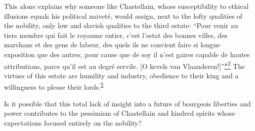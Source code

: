 This alone explains why someone like Chastellain, whose susceptibility
to ethical illusions equals his political naiveté, would assign, next to
the lofty qualities of the nobility, only low and slavish qualities to
the third estate: ``Pour venir au tiers membre qui fait le royaume
entier, c'est l'estat des bonnes villes, des marchans et des gens de
labeur, des quels ils ne convient faire si longue exposition que des
autres, pour cause que de soy il n'est gaires capable de hautes
attributions, parce qu'il est au degré servile. {[}O kevels van
Vlaanderen!{]}''\protect\hypertarget{10_Chapter_Three__THE_HEROIC_DREAM.xhtmlux5cux23id_2467}{\protect\hyperlink{23_NOTES.xhtmlux5cux23id_2468}{*\textsuperscript{2}}}
The virtues of this estate are humility and industry, obedience to their
king and a willingness to please their
lords.\textsuperscript{\protect\hypertarget{10_Chapter_Three__THE_HEROIC_DREAM.xhtmlux5cux23id_1921}{\protect\hyperlink{23_NOTES.xhtmlux5cux23id_1922}{5}}}

Is it possible that this total lack of insight into a future of
bourgeois liberties and power contributes to the pessimism of
Chastellain and kindred spirits whose expectations focused entirely on
the nobility?


